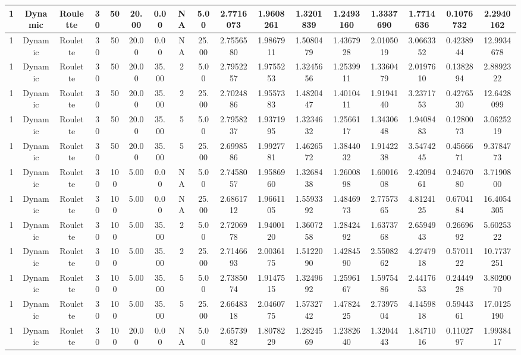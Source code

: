 \documentclass[a4paper]{article}
\begin{document}
\begin{center}
\begin{tabular}{ | c | c | c | c | c | c | c | c | c | c | c | c | c | c | c | c | c | }
		\hline
		1	&	Dynamic	&	Roulette	&	30	&	50	&	20.00	&	0.00	&	NA	&	5.00	&	2.7716073	&	1.9608261	&	1.3201839	&	1.2493160	&	1.3337690	&	1.7714636	&	0.1076732	&	2.2940162 \\
		\hline
		1	&	Dynamic	&	Roulette	&	30	&	50	&	20.00	&	0.00	&	NA	&	25.00	&	2.7556580	&	1.9867911	&	1.5080479	&	1.4367928	&	2.0105019	&	3.0663352	&	0.4238944	&	12.9934678 \\
		\hline
		1	&	Dynamic	&	Roulette	&	30	&	50	&	20.00	&	35.00	&	2	&	5.00	&	2.7952257	&	1.9755253	&	1.3245656	&	1.2539911	&	1.3360479	&	2.0197610	&	0.1382894	&	2.8892322 \\
		\hline
		1	&	Dynamic	&	Roulette	&	30	&	50	&	20.00	&	35.00	&	2	&	25.00	&	2.7024886	&	1.9557383	&	1.4820447	&	1.4010411	&	1.9194140	&	3.2371753	&	0.4276530	&	12.6428099 \\
		\hline
		1	&	Dynamic	&	Roulette	&	30	&	50	&	20.00	&	35.00	&	5	&	5.00	&	2.7958237	&	1.9371995	&	1.3234632	&	1.2566117	&	1.3430648	&	1.9408483	&	0.1280073	&	3.0625219 \\
		\hline
		1	&	Dynamic	&	Roulette	&	30	&	50	&	20.00	&	35.00	&	5	&	25.00	&	2.6998586	&	1.9927781	&	1.4626572	&	1.3844032	&	1.9142238	&	3.5474245	&	0.4566671	&	9.3784773 \\
		\hline
		1	&	Dynamic	&	Roulette	&	30	&	100	&	5.00	&	0.00	&	NA	&	5.00	&	2.7458057	&	1.9586960	&	1.3268438	&	1.2600898	&	1.6001608	&	2.4209461	&	0.2467080	&	3.7190800 \\
		\hline
		1	&	Dynamic	&	Roulette	&	30	&	100	&	5.00	&	0.00	&	NA	&	25.00	&	2.6861712	&	1.9661105	&	1.5593392	&	1.4846973	&	2.7757365	&	4.8124125	&	0.6704184	&	16.4054305 \\
		\hline
		1	&	Dynamic	&	Roulette	&	30	&	100	&	5.00	&	35.00	&	2	&	5.00	&	2.7206978	&	1.9400120	&	1.3607258	&	1.2842492	&	1.6373768	&	2.6594943	&	0.2669692	&	5.6025322 \\
		\hline
		1	&	Dynamic	&	Roulette	&	30	&	100	&	5.00	&	35.00	&	2	&	25.00	&	2.7146693	&	2.0036175	&	1.5122090	&	1.4284590	&	2.5508262	&	4.2747918	&	0.5701122	&	10.7737251 \\
		\hline
		1	&	Dynamic	&	Roulette	&	30	&	100	&	5.00	&	35.00	&	5	&	5.00	&	2.7385074	&	1.9147515	&	1.3249692	&	1.2596167	&	1.5975486	&	2.4417653	&	0.2444928	&	3.8020070 \\
		\hline
		1	&	Dynamic	&	Roulette	&	30	&	100	&	5.00	&	35.00	&	5	&	25.00	&	2.6648318	&	2.0460775	&	1.5732742	&	1.4782425	&	2.7397504	&	4.1459818	&	0.5944361	&	17.0125190 \\
		\hline
		1	&	Dynamic	&	Roulette	&	30	&	100	&	20.00	&	0.00	&	NA	&	5.00	&	2.6573982	&	1.8078229	&	1.2824569	&	1.2382640	&	1.3204443	&	1.8471016	&	0.1102797	&	1.9938417 \\

\end{tabular}
\end{center}
\end{document}
